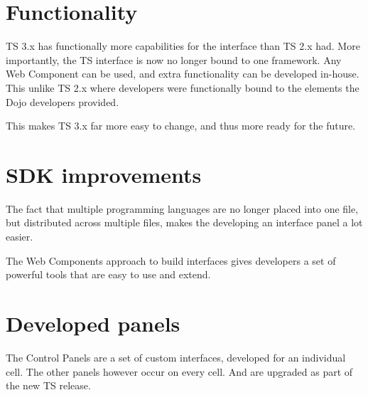 \section{Functionality}
TS 3.x has functionally more capabilities for the interface than TS 2.x had.
More importantly, the TS interface is now no longer bound to one framework.
Any Web Component can be used, and extra functionality can be developed in-house.
This unlike TS 2.x where developers were functionally bound to the elements the Dojo
developers provided.

This makes TS 3.x far more easy to change, and thus more ready for the future.

\section{SDK improvements}
The fact that multiple programming languages are no longer placed into one file,
but distributed across multiple files, makes the developing an interface panel
a lot easier.

The Web Components approach to build interfaces gives developers a set of
powerful tools that are easy to use and extend.


\section{Developed panels}
The Control Panels are a set of custom interfaces, developed for an individual cell.
The other panels however occur on every cell. And are upgraded as part of the
new TS release.
